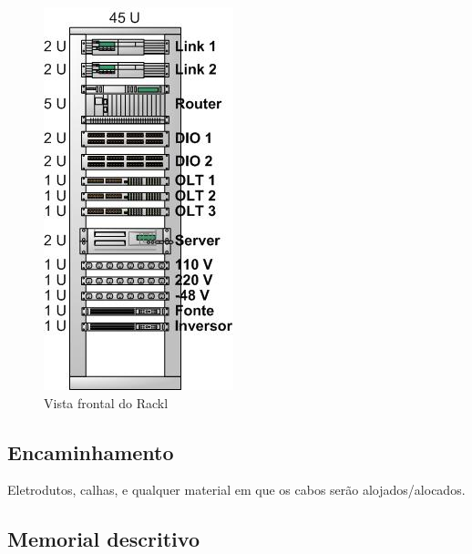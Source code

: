 \documentclass[	DIV=calc,%
							paper=a4,%
							fontsize=12pt,%
							onecolumn]{scrartcl}	 					%
\begin{document}
\begin{figure}
\centering
\includegraphics[height=\textwidth]{rack}
\caption{Vista frontal do Rackl}
\label{rack}
\end{figure}




\subsection{Encaminhamento}
Eletrodutos, calhas, e qualquer material em que os cabos serão alojados/alocados.

\subsection{Memorial descritivo}
\end{document}
